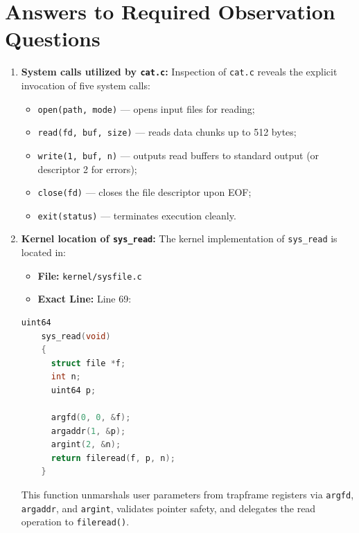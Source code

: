 \documentclass[12pt,a4paper]{report}
\numberwithin{equation}{chapter}
\numberwithin{figure}{chapter}
\numberwithin{table}{chapter}
\begin{document}
\section{Answers to Required Observation Questions}
\begin{enumerate}
    \item \textbf{System calls utilized by \texttt{cat.c}:}
    Inspection of \texttt{cat.c} reveals the explicit invocation of five system calls:
    \begin{itemize}
        \item \texttt{open(path, mode)} --- opens input files for reading;
        \item \texttt{read(fd, buf, size)} --- reads data chunks up to 512 bytes;
        \item \texttt{write(1, buf, n)} --- outputs read buffers to standard output (or descriptor 2 for errors);
        \item \texttt{close(fd)} --- closes the file descriptor upon EOF;
        \item \texttt{exit(status)} --- terminates execution cleanly.
    \end{itemize}

    \item \textbf{Kernel location of \texttt{sys\_read}:}
    The kernel implementation of \texttt{sys\_read} is located in:
    \begin{itemize}
        \item \textbf{File:} \texttt{kernel/sysfile.c}
        \item \textbf{Exact Line:} Line 69:
    \end{itemize}
    \begin{lstlisting}[language=c]
    uint64
    sys_read(void)
    {
      struct file *f;
      int n;
      uint64 p;

      argfd(0, 0, &f);
      argaddr(1, &p);
      argint(2, &n);
      return fileread(f, p, n);
    }
    \end{lstlisting}
    This function unmarshals user parameters from trapframe registers via \texttt{argfd}, \texttt{argaddr}, and \texttt{argint}, validates pointer safety, and delegates the read operation to \texttt{fileread()}.


\end{enumerate}
\end{document}
